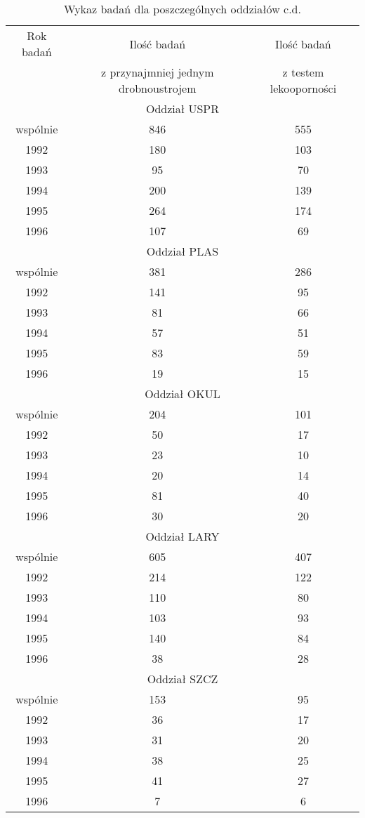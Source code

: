 \documentclass[a4paper,11pt]{article}
\begin{document}
\begin{table}[H]
\begin{center}
\caption{Wykaz badań dla poszczególnych oddziałów c.d.}
\begin{tabular}{c|c|c}
\hline
Rok badań & Ilość badań & Ilość badań \\
& z przynajmniej jednym drobnoustrojem &z testem lekooporności \\

\hline \multicolumn{3}{|c|}{Oddział USPR} \\ \hline
wspólnie &846 &555 \\
1992 &180 &103 \\
1993 &95 &70 \\
1994 &200 &139 \\
1995 &264 &174 \\
1996 &107 &69 \\
\hline \multicolumn{3}{|c|}{Oddział PLAS} \\ \hline
wspólnie &381 &286 \\
1992 &141 &95 \\
1993 &81 &66 \\
1994 &57 &51 \\
1995 &83 &59 \\
1996 &19 &15 \\
\hline \multicolumn{3}{|c|}{Oddział OKUL} \\ \hline
wspólnie &204 &101 \\
1992 &50 &17 \\
1993 &23 &10 \\
1994 &20 &14 \\
1995 &81 &40 \\
1996 &30 &20 \\
\hline \multicolumn{3}{|c|}{Oddział LARY} \\ \hline
wspólnie &605 &407 \\
1992 &214 &122 \\
1993 &110 &80 \\
1994 &103 &93 \\
1995 &140 &84 \\
1996 &38 &28 \\
\hline \multicolumn{3}{|c|}{Oddział SZCZ} \\ \hline
wspólnie &153 &95 \\
1992 &36 &17 \\
1993 &31 &20 \\
1994 &38 &25 \\
1995 &41 &27 \\
1996 &7 &6 \\

\end{tabular}
\end{center}
\end{table}
\end{document}
